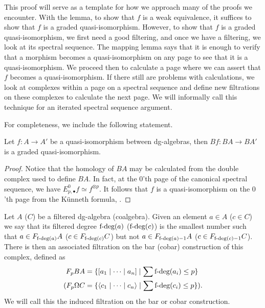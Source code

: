 \documentclass[../thesis.tex]{subfiles}
\begin{document}
            This proof will serve as a template for how we approach many of the proofs we encounter. With the lemma, to show that $f$ is a weak equivalence, it suffices to show that $f$ is a graded quasi-isomorphism. However, to show that $f$ is a graded quasi-isomorphism, we first need a good filtering, and once we have a filtering, we look at its spectral sequence. The mapping lemma says that it is enough to verify that a morphism becomes a quasi-isomorphism on any page to see that it is a quasi-isomorphism. We proceed then to calculate a page where we can assert that $f$ becomes a quasi-isomorphism. If there still are problems with calculations, we look at complexes within a page on a spectral sequence and define new filtrations on these complexes to calculate the next page. We will informally call this technique for an iterated spectral sequence argument.

            For completeness, we include the following statement.

            \begin{lemma}
                Let $f: A \rightarrow A'$ be a quasi-isomorphism between dg-algebras, then $Bf: BA \rightarrow BA'$ is a graded quasi-isomorphism.
            \end{lemma}

            \begin{proof}
                Notice that the homology of $BA$ may be calculated from the double complex used to define $BA$. In fact, at the $0$'th page of the canonical spectral sequence, we have $E^0_{p, \bullet}f \simeq f^{\otimes p}$. It follows that $f$ is a quasi-isomorphism on the $0$'th page from the K\"unneth formula, \cite[Theorem 3.6.3][88]{Weibel94}.            
            \end{proof}

            Let $A$ ($C$) be a filtered dg-algebra (coalgebra). Given an element $a\in A$ ($c\in C$) we say that its filtered degree $\tt{f-deg}(a)$ ($\tt{f-deg}(c)$) is the smallest number such that $a\in F_{\tt{f-deg}(a)}A$ ($c\in F_{\tt{f-deg}(c)}C$) but not $a\in F_{\tt{f-deg}(a)-1}A$ ($c\in F_{\tt{f-deg}(c)-1}C$). There is then an associated filtration on the bar (cobar) construction of this complex, defined as 
            \begin{align*}
                F_pBA & = \startset{[ a_1 \mid \cdots \mid a_n ] \mid \sum \tt{f-deg}(a_i)\leq p} \\
                (F_p\Omega C & = \startset{\langle c_1 \mid \cdots \mid c_n \rangle \mid \sum \tt{f-deg}(c_i) \leq p})\tt{.}
            \end{align*}
            We will call this the induced filtration on the bar or cobar construction.
\end{document}
